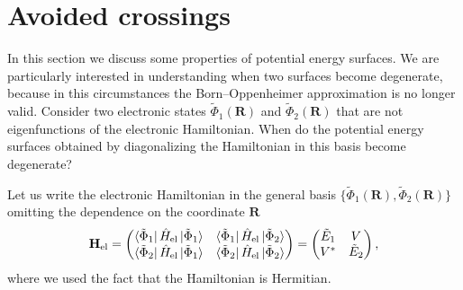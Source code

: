\documentclass[../Main/chem532-notes.tex]{subfiles}
\begin{document}

\section{Avoided crossings}
In this section we discuss some properties of potential energy surfaces. We are particularly interested in understanding when two surfaces become degenerate, because in this circumstances the Born--Oppenheimer approximation is no longer valid.
Consider two electronic states $\tilde{\Phi}_1(\mathbf{R})$ and $\tilde{\Phi}_2(\mathbf{R})$ that are not eigenfunctions of the electronic Hamiltonian. When do the potential energy surfaces obtained by diagonalizing the Hamiltonian in this basis become degenerate? 

Let us write the electronic Hamiltonian in the general basis $\{\tilde{\Phi}_1(\mathbf{R}),\tilde{\Phi}_2(\mathbf{R})\}$ omitting the dependence on the coordinate $\mathbf{R}$
\begin{equation}
\mathbf{H}_\mathrm{el} = 
\begin{pmatrix}
\bra{\tilde{\Phi}_1} \hat{H}_\mathrm{el} \ket{\tilde{\Phi}_1} & \bra{\tilde{\Phi}_1} \hat{H}_\mathrm{el} \ket{\tilde{\Phi}_2}\\
\bra{\tilde{\Phi}_2} \hat{H}_\mathrm{el} \ket{\tilde{\Phi}_1} & \bra{\tilde{\Phi}_2} \hat{H}_\mathrm{el} \ket{\tilde{\Phi}_2}
\end{pmatrix}
=
\begin{pmatrix}
\tilde{E}_{1} & V \\
V^* & \tilde{E}_{2}
\end{pmatrix},
\end{equation}
where we used the fact that the Hamiltonian is Hermitian.
\end{document}

